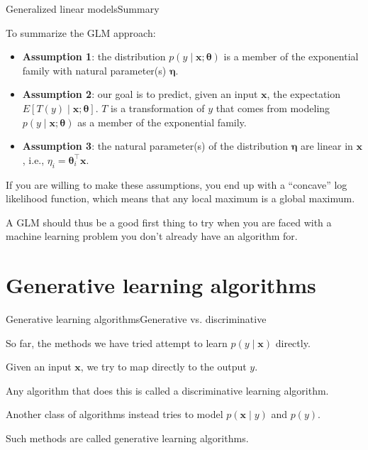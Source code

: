 \documentclass{beamer}
\renewcommand{\vec}[1]{\boldsymbol{#1}}
\begin{document}
\begin{frame}{Generalized linear models}{Summary}

  To summarize the GLM approach:
  \begin{itemize}
    \item \textbf{Assumption 1}: the distribution $p(y \mid \vec{x} ;
      \vec{\theta})$ \alert{is a member of the exponential family}
      with natural parameter(s) $\vec{\eta}$.
    \item \textbf{Assumption 2}: \alert{our goal is to predict}, given
      an input $\vec{x}$, \alert{the expectation} $E[T(y) \mid \vec{x}
        ; \vec{\theta}]$. $T$ is a transformation of $y$ that comes
      from modeling $p(y \mid \vec{x} ; \vec{\theta})$ as a member of
      the exponential family.
    \item \textbf{Assumption 3}: the natural parameter(s) of the
      distribution $\vec{\eta}$ are \alert{linear in $\vec{x}$}, i.e.,
      $\eta_i = \vec{\theta}_i^\top\vec{x}$.
  \end{itemize}

  If you are willing to make these assumptions, you end up with a
  ``concave'' log likelihood function, which means that \alert{any
    local maximum is a global maximum}.

  \medskip

  A GLM should thus be a good first thing to try when you are faced
  with a machine learning problem you don't already have an algorithm
  for.
  
\end{frame}

\section{Generative learning algorithms}

\begin{frame}{Generative learning algorithms}{Generative vs. discriminative}

  So far, the methods we have tried attempt to learn
  $p(y \mid \vec{x})$ directly.

  \medskip

  Given an input $\vec{x}$, we try to map directly to the output $y$.

  \medskip
  
  Any algorithm that does this is called a \alert{discriminative}
  learning algorithm.

  \medskip

  Another class of algorithms instead tries to model $p(\vec{x} \mid
  y)$ and $p(y)$.

  \medskip

  Such methods are called \alert{generative} learning algorithms.
  
\end{frame}
\end{document}
